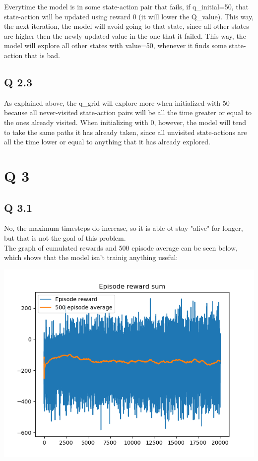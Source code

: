 \documentclass{article}
\begin{document}
Everytime the model is in some state-action pair that fails, if q\_initial=50, that state-action will be updated using reward 0 (it will lower the Q\_value). This way, the next iteration, the model will avoid going to that state, since all other states are higher then the newly updated value in the one that it failed. This way, the model will explore all other states with value=50, whenever it finds some state-action that is bad.

\subsection{Q 2.3}
As explained above, the q\_grid will explore more when initialized with 50 because all never-visited state-action pairs will be all the time greater or equal to the ones already visited. When initializing with 0, however, the model will tend to take the same paths it has already taken, since all unvisited state-actions are all the time lower or equal to anything that it has already explored.

\section{Q 3}
\subsection{Q 3.1}
No, the maximum timesteps do increase, so it is able ot stay "alive" for longer, but that is not the goal of this problem.\\

The graph of cumulated rewards and 500 episode average can be seen below, which shows that the model isn't trainig anything useful:

\includegraphics[scale=0.4]{lunar_lander_training_iter.png}
\end{document}

